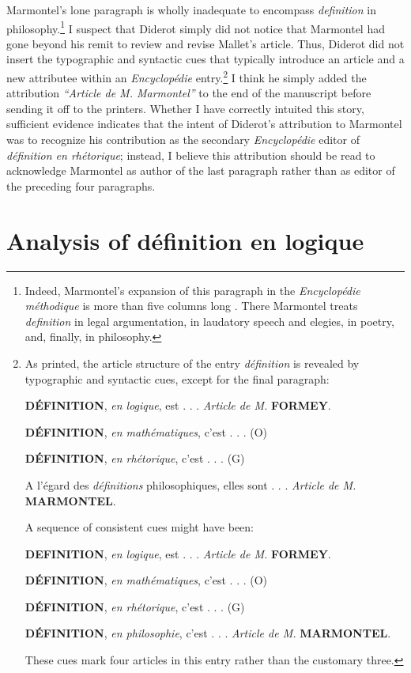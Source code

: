 \documentclass[output=paper]{langscibook}
\begin{document}
Marmontel’s lone paragraph is wholly inadequate to encompass \emph{definition} in philosophy.\footnote{Indeed, Marmontel’s expansion of this paragraph in the \emph{Encyclopédie méthodique} is more than five columns long \citep{Marmontel1782}. There Marmontel treats \emph{definition} in legal argumentation, in laudatory speech and elegies, in poetry, and, finally, in philosophy.}  I suspect that Diderot simply did not notice that Marmontel had gone beyond his remit to review and revise Mallet’s article. Thus, Diderot did not insert the typographic and syntactic cues that typically introduce an article and a new attributee within an \emph{Encyclopédie} entry.\footnote{As printed, the article structure of the entry \emph{définition} is revealed by typographic and syntactic cues, except for the final paragraph:

\textbf{DÉFINITION}, \emph{en logique}, est . . . \emph{Article de M.} \textbf{FORMEY}.

\textbf{DÉFINITION}, \emph{en mathématiques}, c’est . . . (O)

\textbf{DÉFINITION}, \emph{en rhétorique}, c’est . . . (G)

A l’égard des \emph{définitions} philosophiques, elles sont . . . \emph{Article de M.} \textbf{MARMONTEL}.

 
A sequence of consistent cues might have been:


\textbf{DEFINITION}, \emph{en logique}, est . . . \emph{Article de M.} \textbf{FORMEY}.

\textbf{DÉFINITION}, \emph{en mathématiques}, c’est . . . (O)

\textbf{DÉFINITION}, \emph{en rhétorique}, c’est . . . (G)

\textbf{DÉFINITION}, \emph{en philosophie}, c’est . . . \emph{Article de M.} \textbf{MARMONTEL}.


These cues mark four articles in this entry rather than the customary three.
}  I think he simply added the attribution \emph{“Article de M. Marmontel”} to the end of the manuscript before sending it off to the printers. Whether I have correctly intuited this story, sufficient evidence indicates that the intent of Diderot’s attribution to Marmontel was to recognize his contribution as the secondary \emph{Encyclopédie} editor of \emph{définition en rhétorique}; instead, I believe this attribution should be read to acknowledge Marmontel as author of the last paragraph rather than as editor of the preceding four paragraphs.

\section{Analysis of définition en logique}
\end{document}
